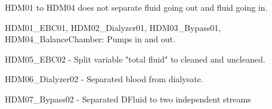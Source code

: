 HDM01 to HDM04 does not separate fluid going out and fluid going in.

HDM01_EBC01, HDM02_Dialyzer01, HDM03_Bypass01, HDM04_BalanceChamber:
Pumps in and out.

HDM05_EBC02 - Split variable "total fluid" to cleaned and uncleaned. 

HDM06_Dialyzer02 - Separated blood from dialysate.

HDM07_Bypass02 - Separated DFluid to two independent streams









